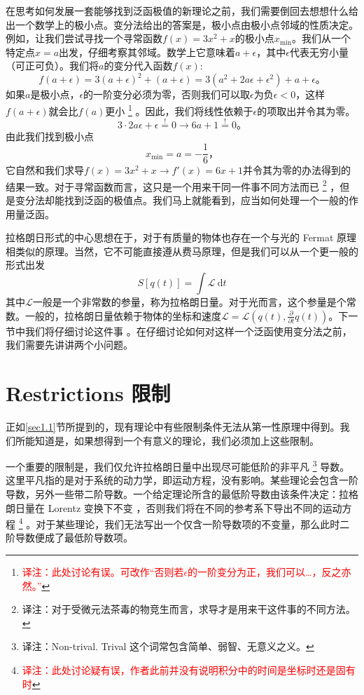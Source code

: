 在思考如何发展一套能够找到泛函极值的新理论之前，我们需要倒回去想想什么给出一个数学上的极小点。变分法给出的答案是，极小点由极小点邻域的性质决定。例如，让我们尝试寻找一个寻常函数\(f(x)=3x^2+x\)的极小点\(x_{\min}\)。我们从一个特定点\(x=a\)出发，仔细考察其邻域。数学上它意味着\(a + \epsilon\)，其中\(\epsilon\)代表无穷小量（可正可负）。我们将\(a\)的变分代入函数\(f(x)\):
\[
f(a+\epsilon) = 3(a+\epsilon)^2+(a+\epsilon) = 3(a^2+2a\epsilon+\epsilon^2)+a+\epsilon \text{。}
\]
如果\(a\)是极小点，\(\epsilon\)的一阶变分必须为零，否则我们可以取\(\epsilon\)为负\(\epsilon < 0\)，这样\(f(a+\epsilon)\)就会比\(f(a)\)更小%
\footnote{\textcolor{red}{译注：此处讨论有误。可改作“否则若$\epsilon$的一阶变分为正，我们可以\dots ，反之亦然。”}}%
。因此，我们将线性依赖于\(\epsilon\)的项取出并令其为零。
\[
3 \cdot 2a\epsilon + \epsilon \overset{\text{!}}{=} 0 \rightarrow 6a+1\overset{\text{!}}{=}0\text{。}
\]
由此我们找到极小点
\[
x_{\min} = a = -\frac{1}{6} \text{，}
\]
它自然和我们求导\(f(x)=3x^2+x\rightarrow f'(x)=6x+1\)并令其为零的办法得到的结果一致。对于寻常函数而言，这只是一个用来干同一件事不同方法而已%
\footnote{译注：对于受微元法茶毒的物竞生而言，求导才是用来干这件事的不同方法。}%
，但是变分法却能找到泛函的极值点。我们马上就能看到，应当如何处理一个一般的作用量泛函。

拉格朗日形式的中心思想在于，对于有质量的物体也存在一个与光的 Fermat 原理相类似的原理。当然，它不可能直接遵从费马原理，但是我们可以从一个更一般的形式出发
\[
S[q(t)]=\int {\mathcal L}~{\mathrm d}t
\]
其中\(\mathcal L\)一般是一个非常数的参量，称为拉格朗日量。对于光而言，这个参量是个常数。一般的，拉格朗日量依赖于物体的坐标和速度\({\mathcal L}={\mathcal L}(q(t),\frac{\partial}{\partial t} q(t))\)。下一节中我们将仔细讨论这件事%
%
。在仔细讨论如何对这样一个泛函使用变分法之前，我们需要先讲讲两个小问题。

\section[限制]{Restrictions \quad 限制}\label{sec4.2}
正如\ref{sec1.1}节所提到的，现有理论中有些限制条件无法从第一性原理中得到。我们所能知道是，如果想得到一个有意义的理论，我们必须加上这些限制。

一个重要的限制是，我们仅允许拉格朗日量中出现尽可能低阶的非平凡%
\footnote{译注：Non-trival. Trival 这个词常包含简单、弱智、无意义之义。}%
导数。这里平凡指的是对于系统的动力学，即运动方程，没有影响。某些理论会包含一阶导数，另外一些带二阶导数。一个给定理论所含的最低阶导数由该条件决定：拉格朗日量在 Lorentz 变换下不变%
%
，否则我们将在不同的参考系下导出不同的运动方程%
\footnote{\textcolor{red}{译注：此处讨论疑有误，作者此前并没有说明积分中的时间是坐标时还是固有时}}%
。对于某些理论，我们无法写出一个仅含一阶导数项的不变量，那么此时二阶导数便成了最低阶导数项。

